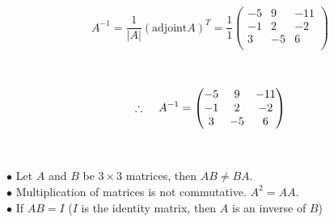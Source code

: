\documentclass[11pt,a4paper]{article}
\begin{document}
$$A^{-1}=\frac{1}{|A|}(\text{adjoint} A)^T= \frac{1}{1}
\begin{pmatrix}
-5 & 9 & -11\\
-1 & 2 & -2\\
3 & -5 & 6\\
\end{pmatrix}
$$\\\\

$$\therefore \hspace{0.4cm} A^{-1}=
\begin{pmatrix}
-5 & 9 & -11\\
-1 & 2 & -2\\
3 & -5 & 6\\
\end{pmatrix}
$$\\\\

$\bullet$ Let $A$ and $B$ be $3\times 3$ matrices, then $AB\neq BA$.\\
$\bullet$ Multiplication of matrices is not commutative. $A^2=AA$.\\
$\bullet$ If $AB=I$ ($I$ is the identity matrix, then $A$ is an inverse of $B$)\\\\
\end{document}
